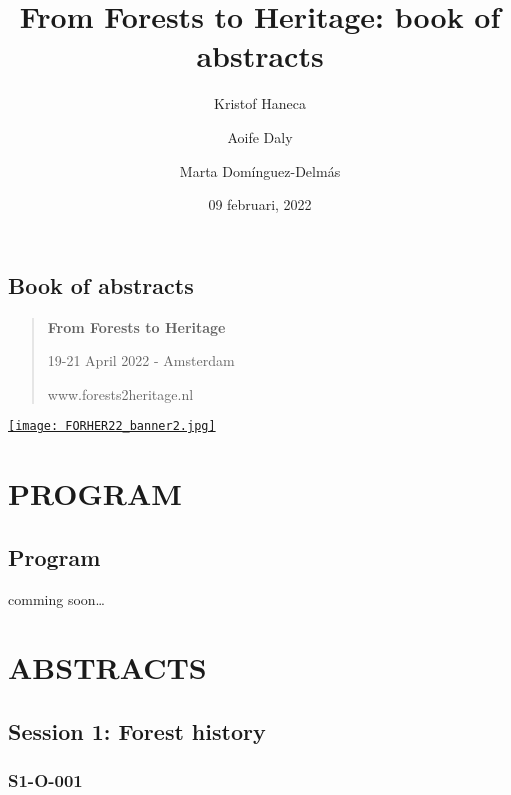 \documentclass[
]{book}
\title{From Forests to Heritage: book of abstracts}
\author{Kristof Haneca \and Aoife Daly \and Marta Domínguez-Delmás}
\date{09 februari, 2022}
\begin{document}
\maketitle

{
\setcounter{tocdepth}{1}
\tableofcontents
}
\hypertarget{book-of-abstracts}{%
\chapter*{Book of abstracts}\label{book-of-abstracts}}

\begin{quote}
\textbf{From Forests to Heritage}

19-21 April 2022 - Amsterdam

www.forests2heritage.nl
\end{quote}

\href{www.forests2heritage.nl}{\texttt{[image: FORHER22\_banner2.jpg]}}

\hypertarget{part-program}{%
\part*{PROGRAM}\label{part-program}}

\hypertarget{program}{%
\chapter*{Program}\label{program}}

comming soon\ldots{}

\hypertarget{part-abstracts}{%
\part*{ABSTRACTS}\label{part-abstracts}}

\hypertarget{session-1-forest-history}{%
\chapter*{Session 1: Forest history}\label{session-1-forest-history}}

\hypertarget{s1-o-001}{%
\section*{S1-O-001}\label{s1-o-001}}
\end{document}
